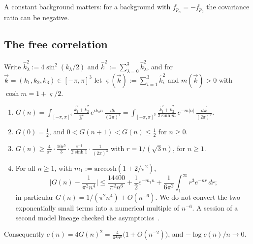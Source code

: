 A constant background matters: for a background with $f_{p_n}=-f_{p_0}$ the covariance ratio can be negative.

\subsection{The free correlation}\label{pf:sec-G}

Write $\hat k_\lambda^2:=4\sin^2(k_\lambda/2)$ and $\hat k^2:=\sum_{\lambda=0}^3\hat k_\lambda^2$, and for $\vec k=(k_1,k_2,k_3)\in[-\pi,\pi]^3$ let $\varsigma (\vec k):=\sum_{i=1}^3\hat k_i^2$ and $m(\vec k)>0$ with $\cosh m=1+\varsigma /2$.

\begin{lemma}\label{pf:lem-G}
\leavevmode
\begin{enumerate}
\item $G(n)=\displaystyle\int_{[-\pi,\pi]^4}\frac{\hat k_1^2+\hat k_2^2}{\hat k^2}\,e^{ik_0n}\,\frac{dk}{(2\pi)^4}=\int_{[-\pi,\pi]^3}\frac{\hat k_1^2+\hat k_2^2}{2\sinh m}\,e^{-m|n|}\,\frac{d\vec k}{(2\pi)^3}$.
\item $G(0)=\tfrac12$, and $0<G(n+1)<G(n)\le\tfrac12$ for $n\ge0$.
\item $G(n)\ge\frac4{\pi^2}\cdot\frac{16r^5}3\cdot\frac{e^{-1}}{2\sinh1}\cdot\frac1{(2\pi)^3}$ with $r=1/(\sqrt3n)$, for $n\ge1$.
\item For all $n\ge1$, with $m_1:=\mathrm{arccosh}(1+2/\pi^2)$,
\[\Big|G(n)-\frac1{\pi^2n^4}\Big|\le\frac{14400}{\pi^2n^6}+\frac12e^{-m_1n}+\frac1{6\pi^2}\int_1^\infty r^3e^{-nr}\,dr ;\]
in particular $G(n)=1/(\pi^2n^4)+O(n^{-6})$. We do not convert the two exponentially small terms into a numerical multiple of $n^{-6}$. A session of a second model lineage checked the asymptotics~\cite[comment 7102490558]{RepoThread}.
\end{enumerate}
Consequently $c(n)=4G(n)^2=\frac4{\pi^4n^8}\big(1+O(n^{-2})\big)$, and $-\log c(n)/n\to0$.
\end{lemma}

